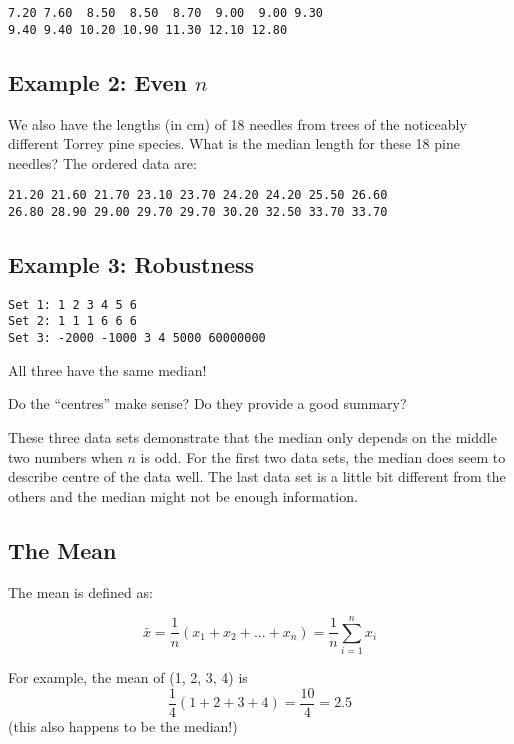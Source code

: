 \documentclass[
  letterpaper,
  DIV=11,
  numbers=noendperiod]{scrreprt}
\begin{document}
\begin{verbatim}
7.20 7.60  8.50  8.50  8.70  9.00  9.00 9.30
9.40 9.40 10.20 10.90 11.30 12.10 12.80
\end{verbatim}

\hypertarget{example-2-even-n}{%
\subsection{\texorpdfstring{Example 2: Even
\(n\)}{Example 2: Even n}}\label{example-2-even-n}}

We also have the lengths (in cm) of 18 needles from trees of the
noticeably different Torrey pine species. What is the median length for
these 18 pine needles? The ordered data are:

\begin{verbatim}
21.20 21.60 21.70 23.10 23.70 24.20 24.20 25.50 26.60
26.80 28.90 29.00 29.70 29.70 30.20 32.50 33.70 33.70
\end{verbatim}

\hypertarget{example-3-robustness}{%
\subsection{Example 3: Robustness}\label{example-3-robustness}}

\begin{verbatim}
Set 1: 1 2 3 4 5 6
Set 2: 1 1 1 6 6 6
Set 3: -2000 -1000 3 4 5000 60000000
\end{verbatim}

All three have the same median!

Do the ``centres'' make sense? Do they provide a good summary?

These three data sets demonstrate that the median only depends on the
middle two numbers when \(n\) is odd. For the first two data sets, the
median does seem to describe centre of the data well. The last data set
is a little bit different from the others and the median might not be
enough information.

\hypertarget{the-mean}{%
\subsection{The Mean}\label{the-mean}}

The mean is defined as:

\[
\bar x = \frac{1}{n}(x_1 + x_2 + ... + x_n)= \frac{1}{n}\sum_{i=1}^nx_i
\]

For example, the mean of (1, 2, 3, 4) is \[
\frac{1}{4}(1 + 2 + 3 + 4) = \frac{10}{4} = 2.5
\] (this also happens to be the median!)
\end{document}
